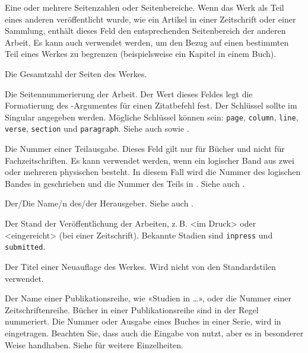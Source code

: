 \documentclass{ltxdockit}[2011/03/25]
\begin{document}
\begin{fieldlist}
Eine oder mehrere Seitenzahlen oder Seitenbereiche. Wenn das Werk als Teil eines
anderen veröffentlicht wurde, wie ein Artikel in einer Zeitschrift oder einer
Sammlung, enthält dieses Feld den entsprechenden Seitenbereich der anderen
Arbeit. Es kann auch verwendet werden, um den Bezug auf einen bestimmten Teil
eines Werkes zu begrenzen (beispielsweise ein Kapitel in einem Buch).


Die Gesamtzahl der Seiten des Werkes.


Die Seitennummerierung der Arbeit. Der Wert dieses Feldes legt die Formatierung
des -Argumentes für einen Zitatbefehl fest. Der Schlüssel sollte
im Singular angegeben werden. Mögliche Schlüssel können sein: \texttt{page},
\texttt{column}, \texttt{line}, \texttt{verse}, \texttt{section} und
\texttt{paragraph}. Siehe auch  sowie .


Die Nummer einer Teilausgabe. Dieses Feld gilt nur für Bücher und nicht für
Fachzeitschriften. Es kann verwendet werden, wenn ein logischer Band aus zwei
oder mehreren physischen besteht. In diesem Fall wird die Nummer des logischen
Bandes in  geschrieben und die Nummer des Teils in
. Siehe auch .


Der/Die Name/n des/der Herausgeber. Siehe auch .


Der Stand der Veröffentlichung der Arbeiten, z.\,B. <im Druck> oder
<eingereicht> (bei einer Zeitschrift). Bekannte Stadien sind \texttt{inpress}
und \texttt{submitted}.


Der Titel einer Neuauflage des Werkes. Wird nicht von den Standardstilen
verwendet.


Der Name einer Publikationsreihe, wie «Studien in \dots», oder die Nummer einer
Zeitschriftenreihe. Bücher in einer Publikationsreihe sind in der Regel
nummeriert. Die Nummer oder Ausgabe eines Buches in einer Serie, wird in
 eingetragen. Beachten Sie, dass auch  die
Eingabe von  nutzt, aber es in besonderer Weise handhaben.
Siehe  für weitere Einzelheiten.


\end{fieldlist}
\end{document}

